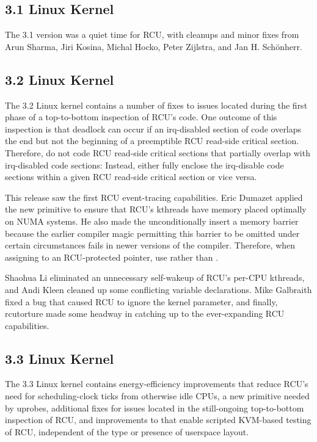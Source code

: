 \subsection{3.1 Linux Kernel}

The 3.1 version was a quiet time for RCU, with cleanups and minor fixes
from Arun Sharma, Jiri Kosina, Michal Hocko, Peter Zijlstra,
and Jan H. Sch\"{o}nherr.

\subsection{3.2 Linux Kernel}

The 3.2 Linux kernel contains a number of fixes to issues located
during the first phase of a top-to-bottom inspection of RCU's code.
One outcome of this inspection is that deadlock can occur if
an irq-disabled section of code overlaps the end but not the beginning
of a preemptible RCU read-side critical section.
Therefore, do not code RCU read-side critical sections that partially
overlap with irq-disabled code sections:
Instead, either fully enclose the irq-disable code sections within a
given RCU read-side critical section or vice versa.

This release saw the first RCU event-tracing capabilities.
Eric Dumazet applied the new
 primitive to ensure that RCU's
kthreads have memory placed optimally on NUMA systems.
He also
made the  unconditionally insert a
memory barrier because the earlier compiler magic permitting this
barrier to be omitted under certain circumstances fails in newer
versions of the compiler.
Therefore, when assigning  to an RCU-protected pointer,
use  rather than .

Shaohua Li eliminated an unnecessary self-wakeup of RCU's per-CPU
kthreads, and Andi Kleen cleaned up some conflicting variable
declarations.
Mike Galbraith fixed a bug that caused RCU to ignore the
 kernel parameter, and finally,
rcutorture made some headway in catching up to the ever-expanding
RCU capabilities.

\subsection{3.3 Linux Kernel}

The 3.3 Linux kernel contains
energy-efficiency improvements that reduce RCU's need for
scheduling-clock ticks from otherwise idle CPUs,
a new  primitive needed by uprobes,
additional fixes for issues located in the still-ongoing top-to-bottom
inspection of RCU,
and improvements to  that enable scripted KVM-based
testing of RCU, independent of the type or presence of userspace layout.

